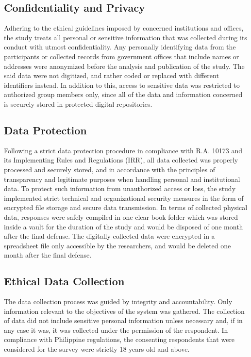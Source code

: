 \subsection{Confidentiality and Privacy}
Adhering to the ethical guidelines imposed by concerned institutions and offices, the study treats all personal or sensitive information that was collected during its conduct with utmost confidentiality. Any personally identifying data from the participants or collected records from government offices that include names or addresses were anonymized before the analysis and publication of the study. The said data were not digitized, and rather coded or replaced with different identifiers instead. In addition to this, access to sensitive data was restricted to authorized group members only, since all of the data and information concerned is securely stored in protected digital repositories.


\subsection{Data Protection}
Following a strict data protection procedure in compliance with R.A. 10173 and its Implementing Rules and Regulations (IRR), all data collected was properly processed and securely stored, and in accordance with the principles of transparency and legitimate purposes when handling personal and institutional data. To protect such information from unauthorized access or loss, the study implemented strict technical and organizational security measures in the form of encrypted file storage and secure data transmission. In terms of collected physical data, responses were safely compiled in one clear book folder which was stored inside a vault for the duration of the study and would be disposed of one month after the final defense. The digitally collected data were encrypted in a spreadsheet file only accessible by the researchers, and would be deleted one month after the final defense.


\subsection{Ethical Data Collection}
The data collection process was guided by integrity and accountability. Only information relevant to the objectives of the system was gathered. The collection of data did not include sensitive personal information unless necessary and, if in any case it was, it was collected under the permission of the respondent. In compliance with Philippine regulations, the consenting respondents that were considered for the survey were strictly 18 years old and above.

